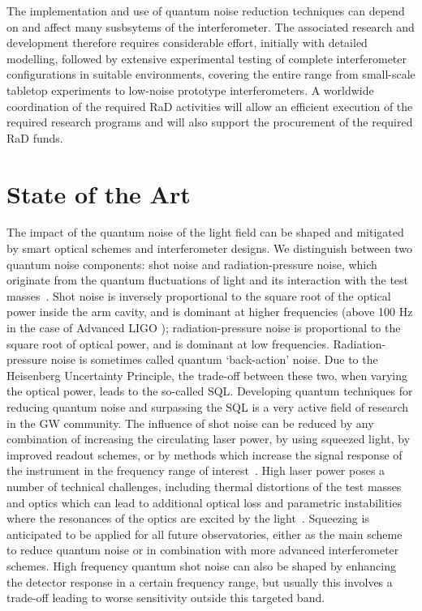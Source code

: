 The implementation and use of quantum noise reduction techniques can depend on and affect many susbsytems of the interferometer. The associated research and development therefore requires considerable effort, initially with detailed modelling, followed by extensive experimental testing of complete interferometer configurations in suitable environments, covering the entire range from small-scale tabletop experiments to low-noise prototype interferometers. A worldwide coordination of the required  \ac{RaD}   activities will allow an efficient execution of the required research programs and will also support the procurement of the required  \ac{RaD}   funds. 

\section{State of the Art}
The impact of the quantum noise of the light field can be shaped and mitigated by smart optical schemes and interferometer designs. We distinguish between two quantum noise components: shot noise and radiation-pressure noise, which originate from the quantum fluctuations of light and its interaction with the test masses~\cite{Cav1980}. Shot noise is inversely proportional to the square root of the optical power inside the arm cavity, and is dominant at higher frequencies (above 100 Hz in the case of Advanced  \ac{LIGO}  ); radiation-pressure noise is proportional to the square root of optical power, and is dominant at low frequencies. Radiation-pressure noise is sometimes called quantum `back-action' noise. Due to the Heisenberg Uncertainty Principle, the trade-off between these two, when varying the optical power, leads to the so-called \ac{SQL}. Developing quantum techniques for reducing quantum noise and surpassing the  \ac{SQL}    is a very active field of research in the  \ac{GW}   community. 
The influence of shot noise can be reduced by any combination of increasing the circulating laser power, by using squeezed light, by improved readout schemes, or by methods which increase the signal response of the instrument in the frequency range of interest~\cite{StMe1991,Mizuno:RSE1993,Osamu:2006}. High laser power poses a number of technical challenges, including thermal distortions of the test masses and optics which can lead to additional optical loss and parametric instabilities where the resonances of the optics are excited by the light~\cite{BSV2001,Evans:2015raa}. Squeezing is anticipated to be applied for all future observatories, either as the main scheme to reduce quantum noise or in combination with more advanced interferometer schemes. High frequency quantum shot noise can also be shaped by enhancing the detector response in a certain frequency range, but usually this involves a trade-off leading to worse sensitivity outside this targeted band.  

